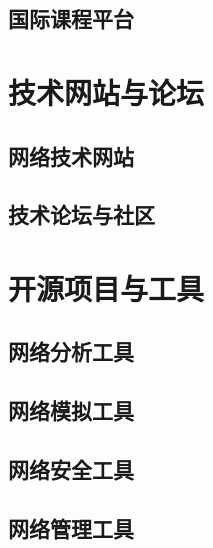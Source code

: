 \documentclass{book}
\begin{document}
\subsection{国际课程平台}
\section{技术网站与论坛}
\subsection{网络技术网站}
\subsection{技术论坛与社区}
\section{开源项目与工具}
\subsection{网络分析工具}
\subsection{网络模拟工具}
\subsection{网络安全工具}
\subsection{网络管理工具}
\end{document}
